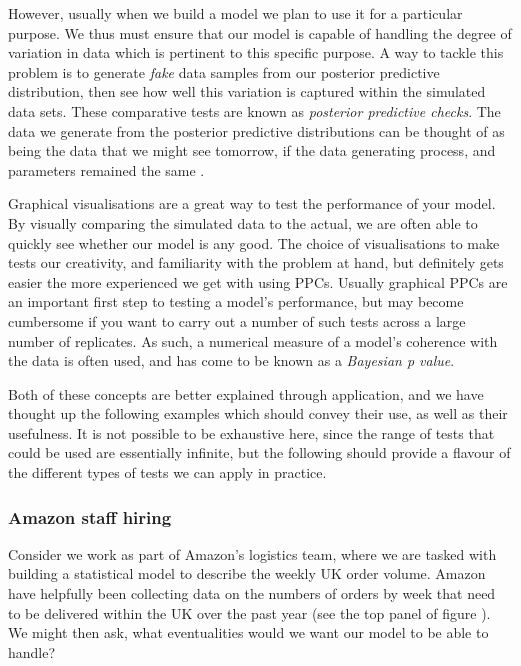 \documentclass[11pt,fullpage]{book}
\begin{document}
However, usually when we build a model we plan to use it for a particular purpose. We thus must ensure that our model is capable of handling the degree of variation in data which is pertinent to this specific purpose. A way to tackle this problem is to generate \textit{fake} data samples from our posterior predictive distribution, then see how well this variation is captured within the simulated data sets. These comparative tests are known as \textit{posterior predictive checks}. The data we generate from the posterior predictive distributions can be thought of as being the data that we might see tomorrow, if the data generating process, and parameters remained the same \cite{gelman2013bayesian}.

Graphical visualisations are a great way to test the performance of your model. By visually comparing the simulated data to the actual, we are often able to quickly see whether our model is any good. The choice of visualisations to make tests our creativity, and familiarity with the problem at hand, but definitely gets easier the more experienced we get with using PPCs. Usually graphical PPCs are an important first step to testing a model's performance, but may become cumbersome if you want to carry out a number of such tests across a large number of replicates. As such, a numerical measure of a model's coherence with the data is often used, and has come to be known as a \textit{Bayesian p value}.

Both of these concepts are better explained through application, and we have thought up the following examples which should convey their use, as well as their usefulness. It is not possible to be exhaustive here, since the range of tests that could be used are essentially infinite, but the following should provide a flavour of the different types of tests we can apply in practice.

\subsubsection{Amazon staff hiring}

Consider we work as part of Amazon's logistics team, where we are tasked with building a statistical model to describe the weekly UK order volume. Amazon have helpfully been collecting data on the numbers of orders by week that need to be delivered within the UK over the past year (see the top panel of figure ). We might then ask, what eventualities would we want our model to be able to handle? 
\end{document}
